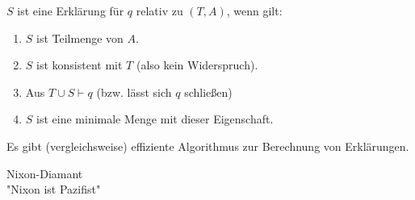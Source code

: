 \documentclass[runningheads,deutsch]{llncs}
\begin{document}
\begin{solution}$S$ ist eine Erklärung für $q$ relativ zu $(T,A)$, wenn gilt:

\begin{enumerate}
    \item $S$ ist Teilmenge von $A$.
    \item $S$ ist konsistent mit $T$ (also kein Widerspruch).
    \item Aus $T \cup S \vdash q$ (bzw. lässt sich $q$ schließen)
    \item $S$ ist eine minimale Menge mit dieser Eigenschaft.
\end{enumerate}

Es gibt (vergleichsweise) effiziente Algorithmus zur Berechnung von Erklärungen.

\end{solution}

\begin{example} Nixon-Diamant\\
    "Nixon ist Pazifist"
\end{example}



\pagebreak
\end{document}

